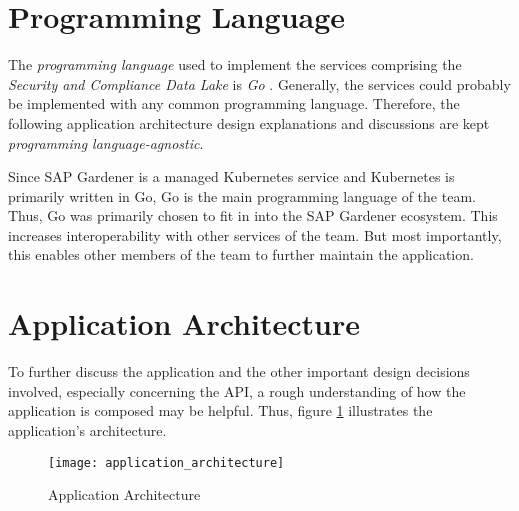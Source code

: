 \section{Programming Language}
The \emph{programming language} used to implement the services comprising the \emph{Security and Compliance Data Lake} is \emph{Go} \cite{Golang}. Generally, the services could probably be implemented with any common programming language. Therefore, the following application architecture design explanations and discussions are kept \emph{programming language-agnostic}.\par 
Since SAP Gardener is a managed Kubernetes service and Kubernetes is primarily written in Go, Go is the main programming language of the team. Thus, Go was primarily chosen to fit in into the SAP Gardener ecosystem. This increases interoperability with other services of the team. But most importantly, this enables other members of the team to further maintain the application. 

\section{Application Architecture}
To further discuss the application and the other important design decisions involved, especially concerning the API, a rough understanding of how the application is composed may be helpful. Thus, figure \ref{fig:ApplicationArchitecture} illustrates the application's architecture. 

\begin{figure}[H]
	\centering
	\texttt{[image: application\_architecture]}
	\caption[Application Architecture]{Application Architecture }
	\label{fig:ApplicationArchitecture}
\end{figure}

